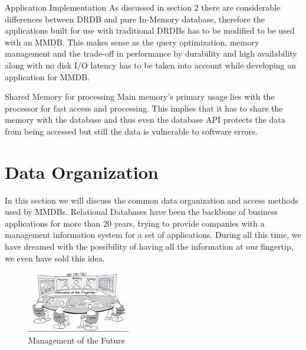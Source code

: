 \documentclass[12pt]{article} %
\begin{document}
\begin{description}
\item {Application Implementation}
As discussed in section 2 there are considerable differences between DRDB and pure In-Memory database, therefore the applications built for use with traditional DRDBs has to be modified to be used with an MMDB. This makes sense as the query optimization, memory management and the trade-off in performance by durability and high availability along with no disk I/O latency has to be taken into account while developing an application for MMDB. 

\item {Shared Memory for processing}
Main memory's primary usage lies with the processor for fast access and processing. This implies that it has to share the memory with the database and thus even the database API protects the data from being accessed but still the data is vulnerable to software errors. 

\end{description}





\section{Data Organization}

In this section we will discuss the common data organization and access methods used by MMDBs. Relational Databases have been the backbone of business applications for more  than 20 years, trying to provide companies with a management information system for a set of applications. During all this time, we have dreamed with the possibility of having all the information at our fingertip, we even have sold this idea\cite{Plattner}.

\begin{figure}
  \begin{center}
    \includegraphics[width=0.4\textwidth]{./pictures/fig5}
  \end{center}
  \caption{Management of the Future}
  \label{fig:fig5}
\end{figure}
\end{document}

